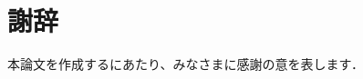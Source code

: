 \documentclass[11pt,a4j]{jreport}
\begin{document}
\chapter*{謝辞} %
本論文を作成するにあたり、みなさまに感謝の意を表します．


\renewcommand{\bibname}{参考文献} %
\end{document}
